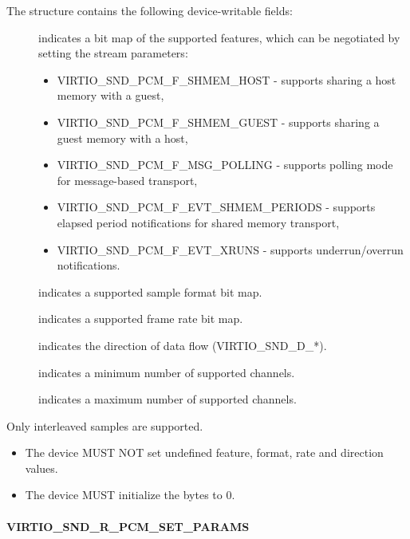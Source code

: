 The structure contains the following device-writable fields:

\begin{description}
\item[] indicates a bit map of the supported features, which can
be negotiated by setting the stream parameters:
\begin{itemize}
\item VIRTIO_SND_PCM_F_SHMEM_HOST - supports sharing a host memory with a guest,
\item VIRTIO_SND_PCM_F_SHMEM_GUEST - supports sharing a guest memory with a host,
\item VIRTIO_SND_PCM_F_MSG_POLLING - supports polling mode for message-based
transport,
\item VIRTIO_SND_PCM_F_EVT_SHMEM_PERIODS - supports elapsed period notifications
for shared memory transport,
\item VIRTIO_SND_PCM_F_EVT_XRUNS - supports underrun/overrun notifications.
\end{itemize}
\item[] indicates a supported sample format bit map.
\item[] indicates a supported frame rate bit map.
\item[] indicates the direction of data flow (VIRTIO_SND_D_*).
\item[] indicates a minimum number of supported channels.
\item[] indicates a maximum number of supported channels.
\end{description}

Only interleaved samples are supported.


\begin{itemize}
\item The device MUST NOT set undefined feature, format, rate and direction
values.
\item The device MUST initialize the  bytes to 0.
\end{itemize}

\paragraph{VIRTIO_SND_R_PCM_SET_PARAMS}\label{sec:Device Types / Sound Device / Device Operation / PCM Stream Parameters}

